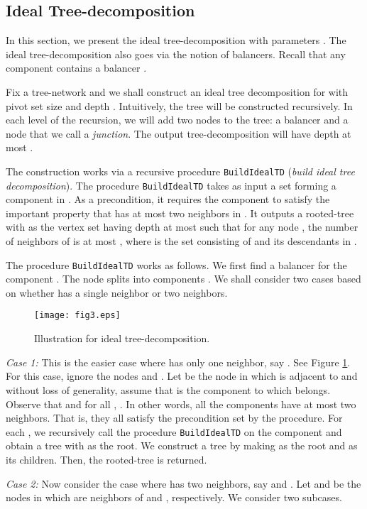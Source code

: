 \documentclass[11pt]{article}
\newcommand{\BuildITD} {{\tt BuildIdealTD}}
\begin{document}
\subsection{Ideal Tree-decomposition}
In this section, we present the ideal tree-decomposition with parameters .
The ideal tree-decomposition also goes via the notion of balancers.
Recall that any component  contains a balancer .

Fix a tree-network  and we shall construct an ideal tree decomposition  for  with pivot set size 
and depth . Intuitively, the tree  will be constructed recursively.
In each level of the recursion, we will add two nodes to the tree: a balancer and a node that we call a {\em junction}.
The output tree-decomposition will have depth at most .

The construction works via a recursive procedure {\BuildITD} ({\em build ideal tree decomposition}).
The procedure {\BuildITD} takes as input a set  forming a component in .
As a precondition, it requires the component  to satisfy the important property that  has at most
two neighbors in .
It outputs a rooted-tree  with  as the vertex set
having depth at most  such that for any node , 
the number of neighbors of  is at most ,
where  is the set consisting of  and its descendants in .

The procedure {\BuildITD} works as follows. We first find a balancer  for the component .
The node  splits  into components . 
We shall consider two cases based on whether  has a single neighbor or two neighbors.

\begin{figure}[t]
\centering
\texttt{[image: fig3.eps]}
\caption{Illustration for ideal tree-decomposition.}
\label{fig:3}
\end{figure}

{\it Case 1: }This is the easier case where  has only one neighbor, say .
See Figure \ref{fig:3}. For this case, ignore the nodes  and .
Let  be the node in  which is adjacent to  and 
without loss of generality, assume that  is the component to which  belongs.
Observe that  and for all , .
In other words, all the components  have at most two neighbors.
That is, they all satisfy the precondition set by the procedure.
For each , we recursively call the procedure {\BuildITD} on the component 
and obtain a tree  with  as the root. 
We construct a tree  by making  as the root and  as its children. 
Then, the rooted-tree  is returned. 

{\it Case 2: }Now consider the case where  has two neighbors, say  and .
Let  and  be the nodes in  which are neighbors of  and , respectively.
We consider two subcases.
\end{document}
